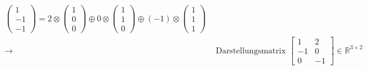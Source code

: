 \documentclass[a5paper, 10pt]{book}
\newcommand{\circleplus}{\oplus}%
\newcommand{\circlecdot}{\otimes}%
\begin{document}
\begin{itemize}
\begin{align}
\begin{pmatrix}
							1 \\ -1 \\ -1
							\end{pmatrix} = 2 \circlecdot \begin{pmatrix}
							1 \\ 0 \\ 0
							\end{pmatrix} \circleplus 0 \circlecdot \begin{pmatrix}
							1 \\ 1 \\ 0
							\end{pmatrix} \circleplus (-1) \circlecdot \begin{pmatrix}
							1 \\ 1 \\ 1
							\end{pmatrix}\\
							\rightarrow& \text{ Darstellungsmatrix }\begin{bmatrix}
							1	& 2 \\
							-1	& 0 \\
							0	& -1
							\end{bmatrix} \in \mathbb{R}^{3 \times 2}
						\end{align}
					\end{itemize}
				
\end{document}
